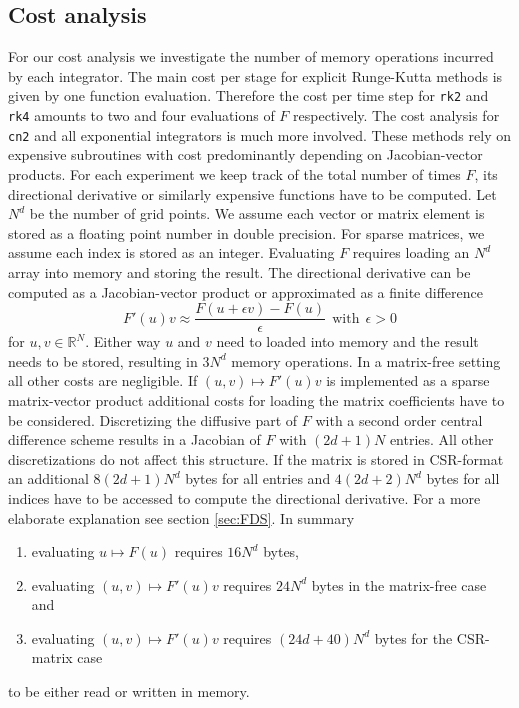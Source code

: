 \documentclass{scrartcl}
\begin{document}
	\subsection{Cost analysis}
	For our cost analysis we investigate the number of memory operations incurred by each integrator. The main cost per stage for explicit Runge-Kutta methods is given by one function evaluation. Therefore the cost per time step for \texttt{rk2} and \texttt{rk4} amounts to two and four evaluations of $F$ respectively. The cost analysis for \texttt{cn2} and all exponential integrators is much more involved. These methods rely on expensive subroutines with cost predominantly depending on Jacobian-vector products. For each experiment we keep track of the total number of times $F$, its directional derivative or similarly expensive functions have to be computed.
	Let $N^d$ be the number of grid points. We assume each vector or matrix element is stored as a floating point number in double precision. For sparse matrices, we assume each index is stored as an integer. Evaluating $F$ requires loading an $N^d$ array into memory and storing the result. The directional derivative can be computed as a Jacobian-vector product or approximated as a finite difference 
	\[
	F'(u)v \approx \frac{F(u+\epsilon v)-F(u)}{\epsilon} ~~\text{with}~~ \epsilon > 0
	\]
	for $u, v\in\mathbb{R}^{N}$.
	Either way $u$ and $v$ need to loaded into memory and the result needs to be stored, resulting in $3N^d$ memory operations. In a matrix-free setting all other costs are negligible. If $(u,v)\mapsto F'(u)v$ is implemented as a sparse matrix-vector product additional costs for loading the matrix coefficients have to be considered. Discretizing the diffusive part of $F$ with a second order central difference scheme results in a Jacobian of $F$ with $(2d+1)N$ entries. All other discretizations do not affect this structure. If the matrix is stored in CSR-format an additional $8(2d+1)N^d$ bytes for all entries and $4(2d+2)N^d$ bytes for all indices have to be accessed to compute the directional derivative. For a more elaborate explanation see section \ref{sec:FDS}.
	In summary
	\begin{enumerate}
		\item evaluating $u \mapsto F(u)$ requires $16N^d$ bytes,
		\item evaluating $(u,v) \mapsto F'(u)v$ requires $24N^d$ bytes in the matrix-free case and
		\item evaluating $(u,v) \mapsto F'(u)v$ requires $(24d+40)N^d$ bytes for the CSR-matrix case
	\end{enumerate}
	to be either read or written in memory. 
	
\end{document}
